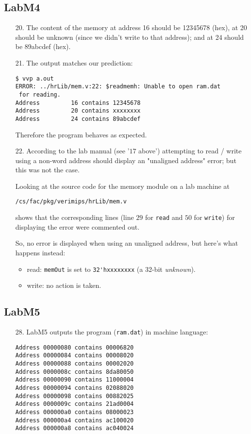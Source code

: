 \documentclass{article}
\begin{document}
\subsection{LabM4}
\begin{enumerate}
\item[20. ] The content of the memory at address 16 should be 12345678 (hex),
at 20 should be unknown (since we didn't write to that address);
and at 24 should be 89abcdef (hex).

\pagebreak

\item[21. ] The output matches our prediction:
\begin{verbatim}
$ vvp a.out
ERROR: ../hrLib/mem.v:22: $readmemh: Unable to open ram.dat
 for reading.
Address         16 contains 12345678
Address         20 contains xxxxxxxx
Address         24 contains 89abcdef
\end{verbatim}
  Therefore the program behaves as expected.

\item[22. ] According to the lab manual (see '$17$ above') attempting to
read / write using a non-word address should display an "unaligned address"
error; but this was not the case. \newline

Looking at the source code for the memory module on a lab machine at
\begin{verbatim}
/cs/fac/pkg/verimips/hrLib/mem.v
\end{verbatim}
shows that the corresponding lines (line $29$ for \verb$read$ and
$50$ for \verb$write$) for displaying the error were commented out. \newline

So, no error is displayed when using an unaligned address, but here's what
happens instead:

\begin{itemize}
\item read: \verb$memOut$ is set to \verb$32'hxxxxxxxx$ (a 32-bit \textit{unknown}).
\item write: no action is taken.
\end{itemize}
\end{enumerate}

\subsection{LabM5}
\begin{enumerate}
\item[28. ] LabM5 outputs the program (\verb$ram.dat$) in machine language:
\begin{verbatim}
Address 00000080 contains 00006820
Address 00000084 contains 00008020
Address 00000088 contains 00002020
Address 0000008c contains 8da80050
Address 00000090 contains 11000004
Address 00000094 contains 02088020
Address 00000098 contains 00882025
Address 0000009c contains 21ad0004
Address 000000a0 contains 08000023
Address 000000a4 contains ac100020
Address 000000a8 contains ac040024
\end{verbatim}
\end{enumerate}
\end{document}
